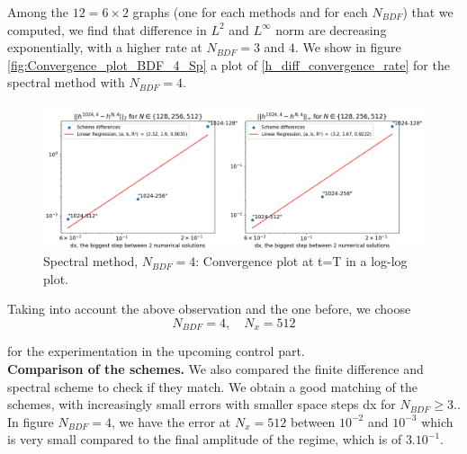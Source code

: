 \documentclass[12pt]{article}
\begin{document}
Among the $12=6\times2$ graphs (one for each methods and for each $N_{BDF}$) that we computed, we find that difference in $L^2$ and $L^{\infty}$ norm are decreasing exponentially, with a higher rate at $N_{BDF}=3$ and $4$. We show in figure \eqref{fig:Convergence_plot_BDF_4_Sp} a plot of \eqref{h_diff_convergence_rate} for the spectral method with $N_{BDF}=4.$
\\

\begin{figure}
    \begin{center}
        \includegraphics[width=\linewidth]{Verif_scheme/Convergence_graph_Sp_method.png}
    \end{center}
    \caption{Spectral method, $N_{BDF}=4$: Convergence plot at t=T in a log-log plot. }
    \label{fig:Convergence_plot_BDF_4_Sp}
\end{figure}

Taking into account the above observation and the one before, we choose 
\begin{equation}\label{var_final_config_tests}
\boxed{
    N_{BDF} = 4, \quad N_x = 512
}
\end{equation}

for the experimentation in the upcoming control part.
\\


\textbf{Comparison of the schemes.} We also compared the finite difference and spectral scheme to check if they match. We obtain a good matching of the schemes, with increasingly small errors with smaller space steps dx for $N_{BDF} \geq 3.$. In figure $N_{BDF}=4$, we have the error at $N_x = 512$ between $10^{-2}$ and ${10^{-3}}$ which is very small compared to the final amplitude of the regime, which is of $3.10^{-1}$.
\end{document}
